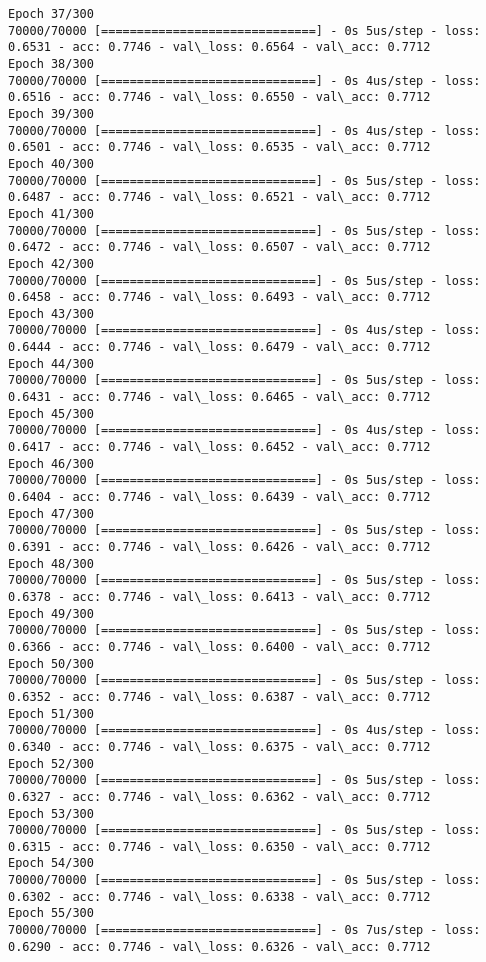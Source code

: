 \documentclass[11pt]{article}
\begin{document}
\begin{Verbatim}[commandchars=\\\{\}]
Epoch 37/300
70000/70000 [==============================] - 0s 5us/step - loss: 0.6531 - acc: 0.7746 - val\_loss: 0.6564 - val\_acc: 0.7712
Epoch 38/300
70000/70000 [==============================] - 0s 4us/step - loss: 0.6516 - acc: 0.7746 - val\_loss: 0.6550 - val\_acc: 0.7712
Epoch 39/300
70000/70000 [==============================] - 0s 4us/step - loss: 0.6501 - acc: 0.7746 - val\_loss: 0.6535 - val\_acc: 0.7712
Epoch 40/300
70000/70000 [==============================] - 0s 5us/step - loss: 0.6487 - acc: 0.7746 - val\_loss: 0.6521 - val\_acc: 0.7712
Epoch 41/300
70000/70000 [==============================] - 0s 5us/step - loss: 0.6472 - acc: 0.7746 - val\_loss: 0.6507 - val\_acc: 0.7712
Epoch 42/300
70000/70000 [==============================] - 0s 5us/step - loss: 0.6458 - acc: 0.7746 - val\_loss: 0.6493 - val\_acc: 0.7712
Epoch 43/300
70000/70000 [==============================] - 0s 4us/step - loss: 0.6444 - acc: 0.7746 - val\_loss: 0.6479 - val\_acc: 0.7712
Epoch 44/300
70000/70000 [==============================] - 0s 5us/step - loss: 0.6431 - acc: 0.7746 - val\_loss: 0.6465 - val\_acc: 0.7712
Epoch 45/300
70000/70000 [==============================] - 0s 4us/step - loss: 0.6417 - acc: 0.7746 - val\_loss: 0.6452 - val\_acc: 0.7712
Epoch 46/300
70000/70000 [==============================] - 0s 5us/step - loss: 0.6404 - acc: 0.7746 - val\_loss: 0.6439 - val\_acc: 0.7712
Epoch 47/300
70000/70000 [==============================] - 0s 5us/step - loss: 0.6391 - acc: 0.7746 - val\_loss: 0.6426 - val\_acc: 0.7712
Epoch 48/300
70000/70000 [==============================] - 0s 5us/step - loss: 0.6378 - acc: 0.7746 - val\_loss: 0.6413 - val\_acc: 0.7712
Epoch 49/300
70000/70000 [==============================] - 0s 5us/step - loss: 0.6366 - acc: 0.7746 - val\_loss: 0.6400 - val\_acc: 0.7712
Epoch 50/300
70000/70000 [==============================] - 0s 5us/step - loss: 0.6352 - acc: 0.7746 - val\_loss: 0.6387 - val\_acc: 0.7712
Epoch 51/300
70000/70000 [==============================] - 0s 4us/step - loss: 0.6340 - acc: 0.7746 - val\_loss: 0.6375 - val\_acc: 0.7712
Epoch 52/300
70000/70000 [==============================] - 0s 5us/step - loss: 0.6327 - acc: 0.7746 - val\_loss: 0.6362 - val\_acc: 0.7712
Epoch 53/300
70000/70000 [==============================] - 0s 5us/step - loss: 0.6315 - acc: 0.7746 - val\_loss: 0.6350 - val\_acc: 0.7712
Epoch 54/300
70000/70000 [==============================] - 0s 5us/step - loss: 0.6302 - acc: 0.7746 - val\_loss: 0.6338 - val\_acc: 0.7712
Epoch 55/300
70000/70000 [==============================] - 0s 7us/step - loss: 0.6290 - acc: 0.7746 - val\_loss: 0.6326 - val\_acc: 0.7712

\end{Verbatim}
\end{document}
